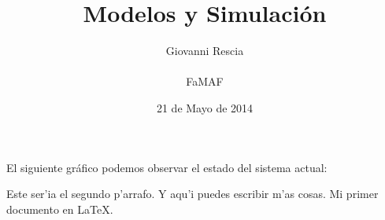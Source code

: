 \documentclass[12pt]{article}
\title{Modelos y Simulaci\'on}
\author{Giovanni Rescia \\ \\ \large FaMAF}
\date{21 de Mayo de 2014}
\begin{document}
\maketitle
\pagebreak

\noindent El siguiente gr\'afico podemos observar el estado del sistema actual:

\begin{figure}[hbt]
\noindent{}
\end{figure}
Este ser'ia el segundo p'arrafo.
Y aqu'i puedes escribir m'as cosas.
Mi primer documento en \LaTeX{}.
\end{document}
